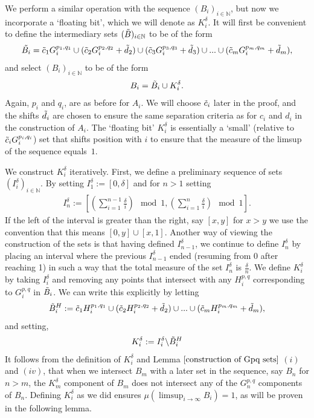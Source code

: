 \documentclass[12pt]{article}
\begin{document}
We perform a similar operation with the sequence $(B_i)_{i \in \mathbb{N}}$, but now we incorporate a `floating bit', which we will denote as $K_i^\delta$. It will first be convenient to define the intermediary sets $(\Tilde{B})_{i \in \mathbb{N}}$ to be of the form
\[\Tilde{B_i}= \Tilde{c}_1 G_{i}^{p_1,q_1} \cup ( \Tilde{c}_2 G_{i}^{p_2,q_2}+ \Tilde{d}_2 ) \cup (\Tilde{c}_3 G_{i}^{p_3,q_3}+\Tilde{d}_3)  \cup ... \cup (\Tilde{c}_m G_{i}^{p_m,q_m}+\Tilde{d}_m ),\]
and select $(B_i)_{i \in \mathbb{N}}$ to be of the form
\[B_i= \Tilde{B}_i \cup  K_i^{\delta}  .\]
Again, $p_i$ and $q_i$, are as before for $A_i$. We will choose  $\Tilde{c}_i$ later in the proof, and the shifts $\Tilde{d}_i$ are chosen to ensure the same separation criteria as for $c_i$ and $d_i$ in the construction of $A_i$. The `floating bit' $K_i^\delta$ is essentially a `small' (relative to $\Tilde{c}_i G_i^{p_i,q_i}$) set that shifts position with $i$ to ensure that the measure of the limsup of the sequence equals~$1$.

We construct $K_i^{\delta}$ iteratively. First, we define a preliminary sequence of sets $\left(I_i^\delta\right)_{i \in \mathbb{N}}$. By setting $I_1^\delta:=[0,\delta]$ and for $n>1$ setting
\begin{align*}
    I_n^\delta:=\left[\left( \sum_{i=1}^{n-1} \frac{\delta}{i}\right) \mod{1},\left( \sum_{i=1}^{n} \frac{\delta}{i}\right) \mod{1}\right].
\end{align*}
If the left of the interval is greater than the right, say $[x,y]$ for $x>y$ we use the convention that this means $[0,y] \cup [x,1]$. Another way of viewing the construction of the sets is that having defined $I_{n-1}^\delta$, we continue to define $I_n^\delta$ by placing an interval where the previous $I_{n-1}^\delta$ ended (resuming from 0 after reaching 1) in such a way that the total measure of the set $I_{n}^\delta$ is $\frac{\delta}{n}$. We define $K_i^\delta$ by taking $I_i^\delta$ and removing any points that intersect with any $H_i^{p,q}$ corresponding to $G_i^{p,q}$ in $\Tilde{B}_i$. We can write this explicitly by letting 
\begin{align*}
    \Tilde{B}_i^H:= \Tilde{c}_1 H_{i}^{p_1,q_1} \cup ( \Tilde{c}_2 H_{i}^{p_2,q_2}+ \Tilde{d}_2 ) \cup ... \cup (\Tilde{c}_m H_{i}^{p_m,q_m}+\Tilde{d}_m ),
\end{align*}
and setting,
\begin{align*}
    K_i^\delta:= I_i^\delta \backslash \Tilde{B}^H_i
\end{align*}
It follows from the definition of $K_i^\delta$ and Lemma $\ref{construction of Gpq sets}$ $(i)$ and $(iv)$, that when we intersect $B_m$ with a later set in the sequence, say $B_n$ for $n>m$, the $K_m^{\delta}$ component of $B_m$ does not intersect any of the $G_n^{p,q}$ components of $B_n$. Defining $K_i^{\delta}$ as we did ensures $\mu(\limsup_{i \rightarrow\infty}B_i)=1$, as will be proven in the following lemma. 
\end{document}
